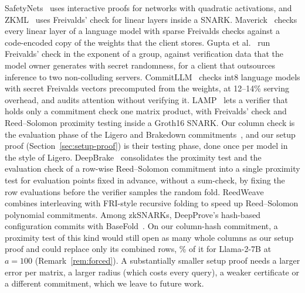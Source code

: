  SafetyNets~\cite{safetynets} uses
interactive proofs for networks with quadratic activations, and ZKML~\cite{zkml} uses Freivalds'
check for linear layers inside a SNARK. Maverick~\cite{maverick} checks every linear layer of a
language model with sparse Freivalds checks against a code-encoded copy of the weights that the
client stores. Gupta et al.~\cite{gupta2026private} run Freivalds' check in the exponent of a
group, against verification data that the model owner generates with secret randomness, for a
client that outsources inference to two non-colluding servers. CommitLLM~\cite{commitllm2026}
checks int8 language models with secret Freivalds vectors precomputed from the weights, at
12--14\% serving overhead, and audits attention without verifying it. LAMP~\cite{lamp} lets a
verifier that holds only a commitment check one matrix product, with Freivalds' check and
Reed--Solomon proximity testing inside a Groth16 SNARK. Our column check is the evaluation phase of
the Ligero and Brakedown commitments~\cite{ligero,brakedown}, and our setup proof
(Section~\ref{sec:setup-proof}) is their testing phase, done once per model in the style of
Ligero. DeepBrake~\cite{deepbrake} consolidates the proximity test and the evaluation check of a
row-wise Reed--Solomon commitment into a single proximity test for evaluation points fixed in
advance, without a sum-check, by fixing the row evaluations before the verifier samples the random
fold. ReedWeave~\cite{reedweave} combines interleaving with FRI-style recursive folding to speed up
Reed--Solomon polynomial commitments. Among zkSNARKs, DeepProve's hash-based configuration commits
with BaseFold~\cite{basefold}. On our column-hash commitment, a proximity test of this kind would
still open as many whole columns as our setup proof and could replace only its combined rows, \SetupCombinedShareLlamaA{}\%
of it for Llama-2-7B at $a=100$ (Remark~\ref{rem:forced}). A substantially smaller setup proof
needs a larger error per matrix, a larger radius (which costs every query), a weaker certificate or a
different commitment, which we leave to future work.

